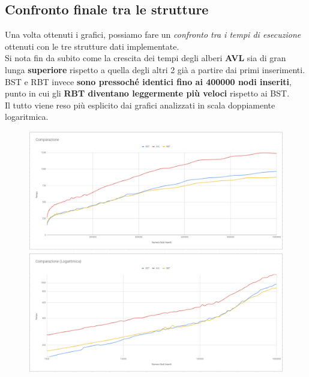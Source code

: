 \documentclass[a4paper]{article}
\begin{document}
		
		\newpage
		\subsection{Confronto finale tra le strutture}
		Una volta ottenuti i grafici, possiamo fare un \textit{confronto tra i tempi di esecuzione} ottenuti con le tre strutture dati implementate.\\
		Si nota fin da subito come la crescita dei tempi degli alberi \textbf{AVL} sia di gran lunga \textbf{superiore} rispetto a quella degli altri 2 già a partire dai primi inserimenti.\\
		BST e RBT invece \textbf{sono pressoché identici fino ai 400000 nodi inseriti}, punto in cui gli \textbf{RBT diventano leggermente più veloci} rispetto ai BST. \\
		Il tutto viene reso più esplicito dai grafici analizzati in scala doppiamente logaritmica.
		\begin{figure}[ht]
			\includegraphics[width=13cm]{ComaprazioneLIN}
			\includegraphics[width=13cm]{ComparazioneLOG}
		\end{figure}
	
\end{document}
